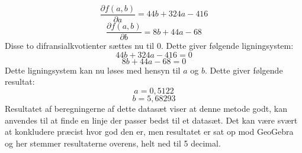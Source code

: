 \begin{equation*}
    \frac{\partial f(a,b)}{\partial a} = 44b + 324a - 416
\end{equation*}
\begin{equation*}
    \frac{\partial f(a,b)}{\partial b} = 8b + 44a - 68
\end{equation*}
Disse to difransialkvotienter sættes nu til 0. Dette giver følgende ligningsystem:
\begin{equation*}
    44b + 324a - 416 = 0
\end{equation*}
\begin{equation*}
    8b + 44a - 68 = 0
\end{equation*}
Dette ligningsystem kan nu løses med hensyn til $a$ og $b$. Dette giver følgende resultat: %
\begin{equation*}
    a = 0,5122 
\end{equation*}
\begin{equation*}
    b = 5,68293
\end{equation*}
Resultatet af beregningerne af dette datasæt viser at denne metode godt, kan anvendes til at finde en linje der passer bedst til et datasæt. Det kan være svært at konkludere præcist hvor god den er, men resultatet er sat op mod GeoGebra og her stemmer resultaterne overens, helt ned til 5 decimal.


